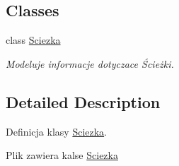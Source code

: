 \subsection*{Classes}
\begin{DoxyCompactItemize}
\item 
class \hyperlink{class_sciezka}{Sciezka}
\begin{DoxyCompactList}\small\item\em Modeluje informacje dotyczace Ścieżki. \end{DoxyCompactList}\end{DoxyCompactItemize}


\subsection{Detailed Description}
Definicja klasy \hyperlink{class_sciezka}{Sciezka}. 

Plik zawiera kalse \hyperlink{class_sciezka}{Sciezka} 